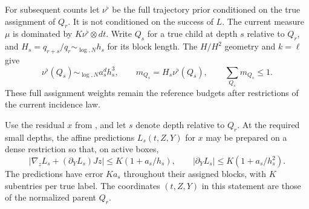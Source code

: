 For subsequent counts let \(\nu^\flat\) be the full trajectory
prior conditioned on the true assignment of \(Q_r\).  It is not
conditioned on the success of \(L\).  The current measure \(\mu\)
is dominated by \(K\nu^\flat\otimes dt\).  Write \(Q_s\) for
a true child at depth \(s\) relative to \(Q_r\), and
\(H_s=q_{r+s}/q_r\sim_{\log,N}h_s\) for its block length.
The \(H/H^2\) geometry and \(k=\ell\) give
\begin{equation}\label{a06:horizontal-budgets}
 \nu^\flat(Q_s)\sim_{\log,N}a_s^dh_s^3,\qquad
 m_{Q_s}=H_s\nu^\flat(Q_s),\qquad
 \sum_{Q_s}m_{Q_s}\le1.
\end{equation}
These full assignment weights remain the reference budgets after
restrictions of the current incidence law.

\begin{lemma}
\label{a06:nested-affine-slopes}
Use the residual \(x\) from , and let
\(s\) denote depth relative to \(Q_r\).  At the required small
depths, the affine predictions \(L_s(t,Z,Y)\) for \(x\) may be
prepared on a dense restriction so that, on active boxes,
\begin{equation}\label{a06:affine-slope-bounds}
 |\nabla_z L_s+(\partial_Y L_s)Jz|
       \le K(1+a_s/h_s),\qquad
 |\partial_Y L_s|\le K(1+a_s/h_s^2).
\end{equation}
The predictions have error \(Ka_s\) throughout their assigned
blocks, with \(K\) subentries per true label.  The coordinates
\((t,Z,Y)\) in this statement are those of the normalized parent
\(Q_r\).
\end{lemma}
